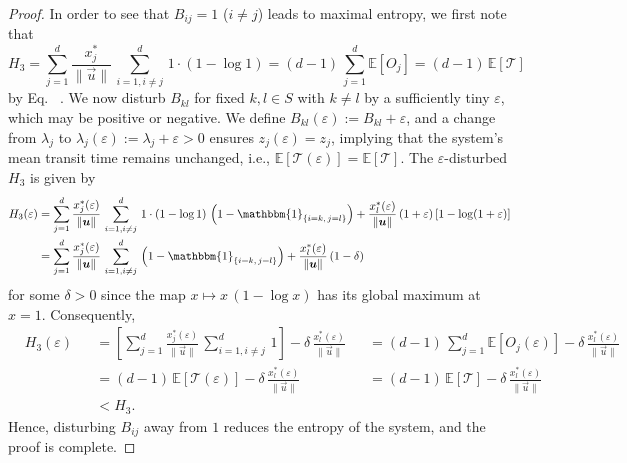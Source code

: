 \documentclass[smallextended]{svjour3}
\makeatletter
\renewcommand*{\eqref}[1]{%
  \hyperref[{#1}]{\textup{\tagform@{\ref*{#1}}}}%
}
\newcommand{\E}{\mathbb{E}}
\newcommand{\TT}{\mathcal{T}}
\newcommand{\suml}{\sum\limits}
\newcommand{\vnorms}[1]{\|#1\|}
\newcommand{\ie}{i.e.}
\makeatother
\begin{document}
\begin{proof}
		In order to see that $B_{ij}=1$ ($i\neq j$) leads to maximal entropy, we first note that 
		\begin{equation*}
			H_3 = \suml_{j=1}^d \frac{x^\ast_j}{\vnorms{\vec{u}}}\,\suml_{i=1,i\neq j}^d \,1\cdot(1-\log 1) = (d-1)\,\suml_{j=1}^d \E\left[O_j\right] = (d-1)\,\E\left[\TT\right]
		\end{equation*}
		by Eq.~\eqref{eqn:H_occupation_time}.
		We now disturb $B_{kl}$ for fixed $k,l\in S$ with $k\neq l$ by a sufficiently tiny $\varepsilon$, which may be positive or negative.
		We define $B_{kl}(\varepsilon):=B_{kl}+\varepsilon$, and a change from $\lambda_j$ to $\lambda_j(\varepsilon):=\lambda_j+\varepsilon>0$ ensures $z_j(\varepsilon) = z_j$, implying that the system's mean transit time remains unchanged, \ie, $\E\left[\TT(\varepsilon)\right] = \E\left[\TT\right]$.
		The $\varepsilon$-disturbed $H_3$ is given by
		\begin{align*}
			H_3(\varepsilon) &= \suml_{j=1}^d \frac{x^\ast_j(\varepsilon)}{\vnorms{\vec{u}}}\,\suml_{i=1,i\neq j}^d \,1\cdot(1-\log 1)\,\left(1-\mathbbm{1}_{\{i=k,\,j=l\}}\right) + \frac{x^\ast_l(\varepsilon)}{\vnorms{\vec{u}}}\,(1+\varepsilon)\,[1-\log(1+\varepsilon)]\\
			&= \suml_{j=1}^d \frac{x^\ast_j(\varepsilon)}{\vnorms{\vec{u}}}\,\suml_{i=1,i\neq j}^d \,\left(1-\mathbbm{1}_{\{i=k,\,j=l\}}\right) + \frac{x^\ast_l(\varepsilon)}{\vnorms{\vec{u}}}\,(1-\delta)\\
		\end{align*}
		for some $\delta>0$ since the map $x\mapsto x\,(1-\log x)$ has its global maximum at $x=1$.
		Consequently,
		\begin{equation*}
		\begin{aligned}
			&H_3(\varepsilon) &&= \left[\suml_{j=1}^d \frac{x^\ast_j(\varepsilon)}{\vnorms{\vec{u}}}\,\suml_{i=1,i\neq j}^d \,1\right] - \delta\,\frac{x^\ast_l(\varepsilon)}{\vnorms{\vec{u}}}
			&&= (d-1)\,\suml_{j=1}^d \E\left[O_j(\varepsilon)\right] - \delta\,\frac{x^\ast_l(\varepsilon)}{\vnorms{\vec{u}}}\\
			& &&= (d-1)\,\E\left[\TT(\varepsilon)\right] - \delta\,\frac{x^\ast_l(\varepsilon)}{\vnorms{\vec{u}}}
			&&= (d-1)\,\E\left[\TT\right] - \delta\,\frac{x^\ast_l(\varepsilon)}{\vnorms{\vec{u}}}\\
			& && < H_3.
		\end{aligned}
	\end{equation*}
		Hence, disturbing $B_{ij}$ away from $1$ reduces the entropy of the system, and the proof is complete.
	\end{proof}
	
\end{document}
